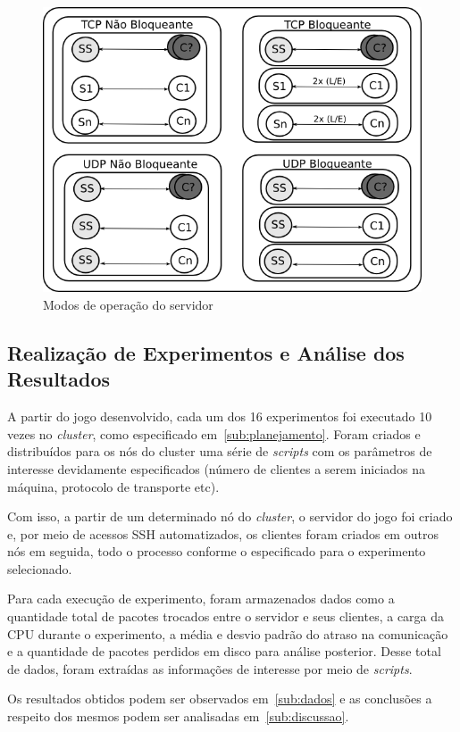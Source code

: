 \documentclass[12pt]{article}
\begin{document}
\begin{figure}[ht]
\centering
\includegraphics[width=.8\textwidth]{img/server.png}
\caption{Modos de operação do servidor}
\label{fig:server}
\end{figure}

\subsection{Realização de Experimentos e Análise dos Resultados} \label{sub:realizacao}

A partir do jogo desenvolvido, cada um dos 16 experimentos foi executado 10
vezes no \textit{cluster}, como especificado em~\ref{sub:planejamento}. Foram
criados e distribuídos para os nós do cluster uma série de \textit{scripts}
com os parâmetros de interesse devidamente especificados (número de clientes a
serem iniciados na máquina, protocolo de transporte etc).

Com isso, a partir de um determinado nó do \textit{cluster}, o servidor do jogo
foi criado e, por meio de acessos SSH automatizados, os clientes foram criados
em outros nós em seguida, todo o processo conforme o especificado para o
experimento selecionado.

Para cada execução de experimento, foram armazenados dados como a quantidade
total de pacotes trocados entre o servidor e seus clientes, a carga da CPU
durante o experimento, a média e desvio padrão do atraso na comunicação e a
quantidade de pacotes perdidos em disco para análise posterior. Desse total de dados,
foram extraídas as informações de interesse por meio de \textit{scripts}.

Os resultados obtidos podem ser observados em~\ref{sub:dados} e as conclusões a respeito
dos mesmos podem ser analisadas em~\ref{sub:discussao}.
\end{document}
